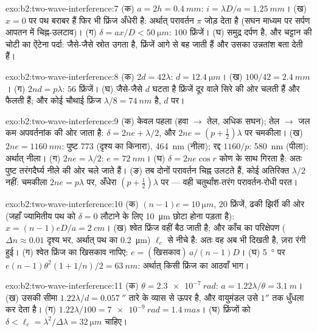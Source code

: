 \begin{solution}{exo:b2:two-wave-interference:7}
(क) $a = 2h = \qty{0.4}{mm}$: $i = \lambda D/a = \qty{1.25}{mm}$। (ख) $x = 0$ पर पथ
बराबर हैं फिर भी फ्रिंज अँधेरी है: अर्थात् परावर्तन $\pi$ जोड़ देता है (सघन माध्यम पर
सर्पण आपतन में चिह्न-उलटाव)। (ग) $\delta = ax/D <
\qty{50}{\micro m}$: $100$ फ्रिंजें। (घ) समुद्र दर्पण है, और चट्टान की चोटी का
ऐंटेना पर्दा: जैसे-जैसे स्रोत उगता है, फ्रिंजें आगे से बह जाती हैं और
उसका उन्नतांश बता देती हैं।
\end{solution}

\begin{solution}{exo:b2:two-wave-interference:8}
(क) $2d = 42\lambda$: $d = \qty{12.4}{\micro m}$। (ख) $100/42 = \qty{2.4}{mm}$। (ग) $2nd = p\lambda$:
$56$ फ्रिंजें। (घ) जैसे-जैसे $d$ घटता है फ्रिंजें दूर वाले सिरे की ओर चलती हैं और
फैलती हैं; और कोई चौथाई फ्रिंज $\lambda/8 = \qty{74}{nm}$ है, $d$ पर।
\end{solution}

\begin{solution}{exo:b2:two-wave-interference:9}
(क) केवल पहला (हवा $\to$ तेल, अधिक सघन); तेल $\to$ जल कम अपवर्तनांक की
ओर जाता है: $\delta = 2ne + \lambda/2$, और $2ne = (p + \tfrac12)\lambda$ पर चमकीला। (ख) $2ne =
\qty{1160}{nm}$: पुष्ट $773$ (दृश्य का किनारा), \qty{464}{nm} (नीला);
रद्द $1160/p$: \qty{580}{nm} (पीला): अर्थात् नीला। (ग) $2ne = \lambda/2$: $e = \qty{72}{nm}$।
(घ) $\delta = 2ne\cos r$ कोण के साथ गिरता है: अतः पुष्ट तरंगदैर्घ्य
नीले की ओर चले जाते हैं। (ङ) तब दोनों परावर्तन चिह्न उलटते हैं, कोई
अतिरिक्त $\lambda/2$ नहीं: चमकीला $2ne = p\lambda$ पर, अँधेरा $(p + \tfrac12)\lambda$ पर --- वही
चतुर्थांश-तरंग परावर्तन-रोधी परत।
\end{solution}

\begin{solution}{exo:b2:two-wave-interference:10}
(क) $(n - 1)e = \qty{10}{\micro m}$, $20$ फ्रिंजें, ढकी झिर्री की ओर (जहाँ
ज्यामितीय पथ को $\delta = 0$ लौटाने के लिए \qty{10}{\micro m} छोटा होना पड़ता है):
$x = (n - 1)eD/a = \qty{2}{cm}$। (ख) श्वेत फ्रिंज वहीं बैठ जाती है; और काँच का
परिक्षेपण ($\Delta n \approx 0.01$ दृश्य भर, अर्थात् पथ का \qty{0.2}{\micro m})
$\ell_c$ से नीचे है: अतः वह अब भी दिखती है, ज़रा रंगी हुई। (ग) श्वेत फ्रिंज का
खिसकाव नापिए: $e = (\text{खिसकाव})\,a/(n - 1)D$। (घ) \qty{5}{\degree} पर $e(n - 1)\theta^2
(1 + 1/n)/2 = \qty{63}{nm}$: अर्थात् किसी फ्रिंज का आठवाँ भाग।
\end{solution}

\begin{solution}{exo:b2:two-wave-interference:11}
(क) $\theta = \qty{2.3e-7}{rad}$: $a = 1.22\lambda/\theta = \qty{3.1}{m}$। (ख) उसकी सीमा $1.22\lambda/d =
\qty{0.057}{''}$ तारे के व्यास से ऊपर है, और वायुमंडल उसे
$1''$ तक धुँधला कर देता है। (ग) $1.22\lambda/100 = \qty{7e-9}{rad} = \qty{1.4}{mas}$। (घ) फ्रिंजों को
$\delta < \ell_c = \lambda^2/\Delta\lambda = \qty{32}{\micro m}$ चाहिए।
\end{solution}

